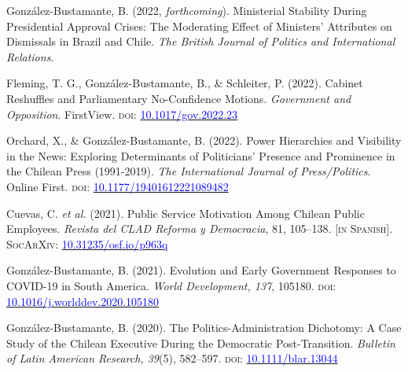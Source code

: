 \begin{publications}

\begin{benumerate}{9}

\item{González-Bustamante, B. (2022, {\itshape forthcoming}). Ministerial Stability During Presidential Approval Crises: The Moderating Effect of Ministers' Attributes on Dismissals in Brazil and Chile. {\itshape The British Journal of Politics and International Relations}.}\vspace{1mm}

\item{Fleming, T. G., González-Bustamante, B., \& Schleiter, P. (2022). Cabinet Reshuffles and Parliamentary No-Confidence Motions. {\itshape Government and Opposition}. FirstView. {\scshape doi:} \href{https://doi.org/10.1017/gov.2022.23}{\textcolor{blue}{10.1017/gov.2022.23}}}\vspace{1mm}

\item{Orchard, X., \& González-Bustamante, B. (2022). Power Hierarchies and Visibility in the News: Exploring Determinants of Politicians’ Presence and Prominence in the Chilean Press (1991-2019). {\itshape The International Journal of Press/Politics}. Online First. {\scshape doi:} \href{https://doi.org/10.1177/19401612221089482}{\textcolor{blue}{10.1177/19401612221089482}}}\vspace{1mm}

\item{\small Cuevas, C. {\itshape et al.} (2021). Public Service Motivation Among Chilean Public Employees. {\itshape Revista del CLAD Reforma y Democracia}, 81, 105--138. {\footnotesize \scshape [in Spanish]}. {\scshape \footnotesize SocArXiv}: \href{https://doi.org/10.31235/osf.io/p963q}{\textcolor{blue}{10.31235/osf.io/p963q}}}\vspace{1mm}

\item{\small González-Bustamante, B. (2021). Evolution and Early Government Responses to COVID-19 in South America. {\itshape World Development, 137}, 105180. {\scshape doi:} \href{https://doi.org/10.1016/j.worlddev.2020.105180}{\textcolor{blue}{10.1016/j.worlddev.2020.105180}}}\vspace{1mm}

\item{\small González-Bustamante, B. (2020). The Politics-Administration Dichotomy: A Case Study of the Chilean Executive During the Democratic Post-Transition. {\itshape Bulletin of Latin American Research, 39}(5), 582--597. {\scshape doi}: \href{https://doi.org/10.1111/blar.13044}{\textcolor{blue}{10.1111/blar.13044}}}\vspace{1mm}


\end{benumerate}
\end{publications}
